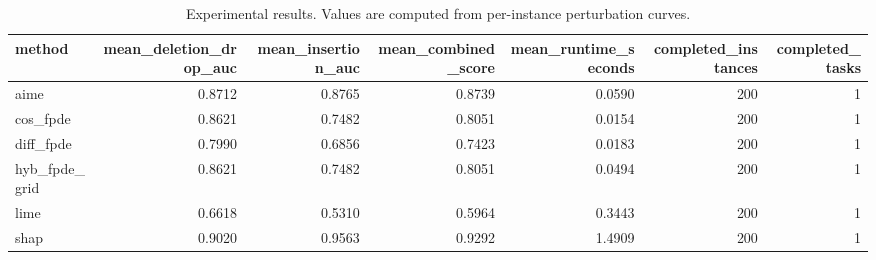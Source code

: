 \begin{table}[t]
\caption{Experimental results. Values are computed from per-instance perturbation curves.}
\label{tab:main_results_computed}
\centering
\begin{tabular}{lrrrrrr}
\toprule
method & mean\_deletion\_drop\_auc & mean\_insertion\_auc & mean\_combined\_score & mean\_runtime\_seconds & completed\_instances & completed\_tasks \\
\midrule
aime & 0.8712 & 0.8765 & 0.8739 & 0.0590 & 200 & 1 \\
cos\_fpde & 0.8621 & 0.7482 & 0.8051 & 0.0154 & 200 & 1 \\
diff\_fpde & 0.7990 & 0.6856 & 0.7423 & 0.0183 & 200 & 1 \\
hyb\_fpde\_grid & 0.8621 & 0.7482 & 0.8051 & 0.0494 & 200 & 1 \\
lime & 0.6618 & 0.5310 & 0.5964 & 0.3443 & 200 & 1 \\
shap & 0.9020 & 0.9563 & 0.9292 & 1.4909 & 200 & 1 \\
\bottomrule
\end{tabular}

\end{table}
